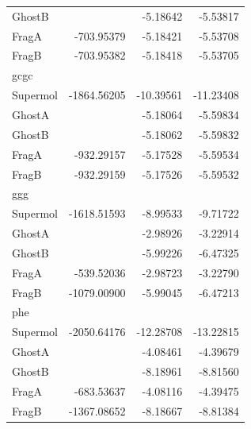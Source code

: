 \documentclass[journal=jctcce,manuscript=article]{achemso}
\begin{document}
\begin{spacing}{1}
\begin{longtable}[H]{lRRR}
    GhostB &       & -5.18642 & -5.53817 \\
    FragA & -703.95379 & -5.18421 & -5.53708 \\
    FragB & -703.95382 & -5.18418 & -5.53705 \\
    gcgc  &       &       &  \\
    Supermol & -1864.56205 & -10.39561 & -11.23408 \\
    GhostA &       & -5.18064 & -5.59834 \\
    GhostB &       & -5.18062 & -5.59832 \\
    FragA & -932.29157 & -5.17528 & -5.59534 \\
    FragB & -932.29159 & -5.17526 & -5.59532 \\
    ggg   &       &       &  \\
    Supermol & -1618.51593 & -8.99533 & -9.71722 \\
    GhostA &       & -2.98926 & -3.22914 \\
    GhostB &       & -5.99226 & -6.47325 \\
    FragA & -539.52036 & -2.98723 & -3.22790 \\
    FragB & -1079.00900 & -5.99045 & -6.47213 \\
    phe   &       &       &  \\
    Supermol & -2050.64176 & -12.28708 & -13.22815 \\
    GhostA &       & -4.08461 & -4.39679 \\
    GhostB &       & -8.18961 & -8.81560 \\
    FragA & -683.53637 & -4.08116 & -4.39475 \\
    FragB & -1367.08652 & -8.18667 & -8.81384
\end{longtable}


\end{spacing}
\end{document}

